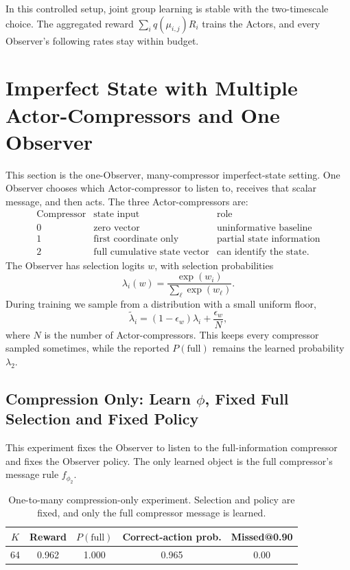 \documentclass[11pt]{article}
\newcommand{\reportprob}{q}
\begin{document}
In this controlled setup, joint group learning is stable with the two-timescale
choice. The aggregated reward \(\sum_i\reportprob(\mu_{i,j})R_i\) trains the
Actors, and every Observer's following rates stay within budget.
\section{Imperfect State with Multiple Actor-Compressors and One Observer}

This section is the one-Observer, many-compressor imperfect-state setting. One
Observer chooses which Actor-compressor to listen to, receives that scalar
message, and then acts. The three Actor-compressors are:
\[
\begin{array}{c|c|c}
\text{Compressor} & \text{state input} & \text{role} \\
\hline
0 & \text{zero vector} & \text{uninformative baseline} \\
1 & \text{first coordinate only} & \text{partial state information} \\
2 & \text{full cumulative state vector} & \text{can identify the state}.
\end{array}
\]
The Observer has selection logits \(w\), with selection probabilities
\[
  \lambda_i(w)=\frac{\exp(w_i)}{\sum_\ell \exp(w_\ell)}.
\]
During training we sample from a distribution with a small uniform floor,
\[
  \tilde\lambda_i=(1-\epsilon_w)\lambda_i+\frac{\epsilon_w}{N},
\]
where \(N\) is the number of Actor-compressors. This keeps every compressor
sampled sometimes, while the reported \(P(\mathrm{full})\) remains the learned
probability \(\lambda_2\).

\subsection{Compression Only: Learn \(\phi\), Fixed Full Selection and Fixed Policy}

This experiment fixes the Observer to listen to the full-information compressor
and fixes the Observer policy. The only learned object is the full compressor's
message rule \(f_{\phi_2}\).

\begin{table}[H]
\centering
\small
\begin{tabular}{ccccc}
\toprule
\(K\) & Reward & \(P(\mathrm{full})\) & Correct-action prob. & Missed@0.90 \\
\midrule
64 & 0.962 & 1.000 & 0.965 & 0.00 \\
\bottomrule
\end{tabular}
\caption{One-to-many compression-only experiment. Selection and policy are
fixed, and only the full compressor message is learned.}
\label{tab:one-to-many-phi-only}
\end{table}
\end{document}

